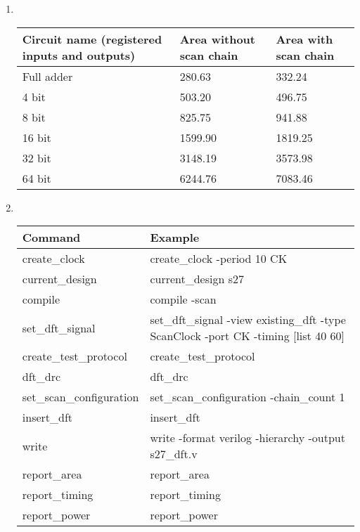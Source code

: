 \documentclass[a4paper,12pt]{article}
\begin{document}
\begin{enumerate}
        \item \mbox{}\\

            \begin{tabularx}{\textwidth}{|X|X|X|}
                \hline
                Circuit name (registered inputs and outputs) & Area without scan chain & Area with scan chain \\ \hline
                Full adder & 280.63 & 332.24\\ \hline
                4 bit & 503.20 & 496.75\\ \hline
                8 bit & 825.75 & 941.88\\ \hline
                16 bit & 1599.90 & 1819.25\\ \hline
                32 bit & 3148.19 & 3573.98\\ \hline
                64 bit & 6244.76 & 7083.46\\ \hline
            \end{tabularx}

        \item \mbox{}\\

            \begin{tabularx}{\textwidth}{|X|X|}
                \hline
                Command & Example \\ \hline
                create\_clock & create\_clock -period 10 CK \\ \hline
                current\_design & current\_design s27 \\ \hline
                compile & compile -scan \\ \hline
                set\_dft\_signal & set\_dft\_signal -view existing\_dft -type ScanClock -port CK -timing [list 40 60] \\ \hline
                create\_test\_protocol & create\_test\_protocol \\ \hline
                dft\_drc & dft\_drc \\ \hline
                set\_scan\_configuration & set\_scan\_configuration -chain\_count 1 \\ \hline
                insert\_dft & insert\_dft \\ \hline
                write & write -format verilog -hierarchy -output s27\_dft.v \\ \hline
                report\_area & report\_area \\ \hline
                report\_timing & report\_timing \\ \hline
                report\_power & report\_power \\ \hline
            \end{tabularx}

    \end{enumerate}
\end{document}
